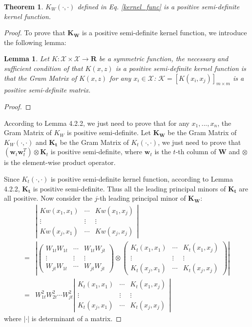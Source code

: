 \documentclass[10pt,journal,compsoc]{IEEEtran}
\newtheorem{theorem}[subsubsection]{Theorem}
\newtheorem{lemma}[subsubsection]{Lemma}
\begin{document}
\begin{theorem}
$K_W(\cdot,\cdot)$ defined in Eq. \eqref{kernel_func} is a positive semi-definite kernel function.
\end{theorem}
\begin{proof}
To prove that $\mathbf{K_W}$ is a positive semi-definite kernel function, we introduce the following lemma:
\begin{lemma}
Let $K:\mathcal{X}\times\mathcal{X}\to \mathbf{R}$ be a symmetric function, the necessary and sufficient condition of that $K(x,z)$ is a positive semi-definite kernel function is that the Gram Matrix of $K(x,z)$ for any $x_i \in \mathcal{X}$: $\mathcal{K}=[K(x_i,x_j)]_{m\times m}$ is a positive semi-definite matrix.
\end{lemma}
\begin{proof}
\end{proof}
According to Lemma 4.2.2, we just need to prove that for any $x_1,...,x_n$, the Gram Matrix of $K_W$ is positive semi-definite. Let $\mathbf{K_W}$ be the Gram Matrix of $K_W(\cdot,\cdot)$ and $\mathbf{K_t}$ be the Gram Matrix of $K_t(\cdot,\cdot)$, we just need to prove that $(\mathbf{w}_{t} \mathbf{w}_{t}^T) \otimes \mathbf{K}_t$ is positive semi-definite, where $\mathbf{w}_t$ is the $t$-th column of $\mathbf{W}$ and $\otimes$ is the element-wise product operator.

Since $K_t(\cdot,\cdot)$ is positive semi-definite kernel function, according to Lemma 4.2.2, $\mathbf{K_t}$ is positive semi-definite. Thus all the leading principal minors of $\mathbf{K_t}$ are all positive. Now  consider the $j$-th leading principal minor of $\mathbf{K_W}$:
\begin{align}
&\left|
\begin{array}{ccc}
Kw(x_1,x_1) & \cdots & Kw(x_1,x_j) \\
\vdots & \vdots & \vdots \\
Kw(x_j,x_1) & \cdots & Kw(x_j,x_j)
\end{array}
\right|\\
=&\left|
\left(
\begin{array}{ccc}
W_{1t}W_{1t} & \cdots & W_{1t}W_{jt} \\
\vdots & \vdots & \vdots \\
W_{jt}W_{1t} & \cdots & W_{jt}W_{jt}
\end{array}
\right)
\otimes\left(
\begin{array}{ccc}
K_t(x_1,x_1) & \cdots & K_t(x_1,x_j) \\
\vdots & \vdots & \vdots \\
K_t(x_j,x_1) & \cdots & K_t(x_j,x_j)
\end{array}
\right)
\right| \nonumber\\
=&W_{1t}^2W_{2t}^2\cdots W_{jt}^2
\left|
\begin{array}{ccc}
K_t(x_1,x_1) & \cdots & K_t(x_1,x_j) \\
\vdots & \vdots & \vdots \\
K_t(x_j,x_1) & \cdots & K_t(x_j,x_j)
\end{array}
\right| \nonumber
\end{align}
where $|\cdot|$ is determinant of a matrix.


\end{proof}
\end{document}
